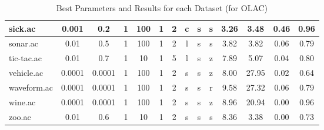\begin{table}[htbp]
\begin{tabular}{|l|c|c|c|c|c|c|c|c|c||c|c|c|c|}
		\hline
		sick.ac        & 0.001    & 0.2         & 1              & 100                 & 1             & 2             & c      & s        & s        & 3.26           & 3.48           & 0.46           & 0.96           \\
		\hline
		sonar.ac       & 0.01     & 0.5         & 1              & 100                 & 1             & 2             & l      & s        & s        & 3.82           & 3.82           & 0.06           & 0.79           \\
		\hline
		tic-tac.ac     & 0.01     & 0.7         & 1              & 10                  & 1             & 5             & l      & s        & z        & 7.89           & 5.07           & 0.04           & 0.80           \\
		\hline
		vehicle.ac     & 0.0001   & 0.0001      & 1              & 100                 & 1             & 2             & s      & s        & z        & 8.00           & 27.95          & 0.02           & 0.64           \\
		\hline
		waveform.ac    & 0.0001   & 0.0001      & 1              & 100                 & 1             & 2             & s      & s        & r        & 9.58           & 27.32          & 0.06           & 0.79           \\
		\hline
		wine.ac        & 0.0001   & 0.0001      & 1              & 100                 & 1             & 2             & s      & s        & z        & 8.96           & 20.94          & 0.00           & 0.96           \\
		\hline
		zoo.ac         & 0.01     & 0.6         & 1              & 10                  & 1             & 2             & s      & s        & s        & 8.36           & 3.38           & 0.00           & 0.73           \\
		\hline
		\end{tabular}
	\caption{Best Parameters and Results for each Dataset (for OLAC)}
	\label{tab:best_runs_for_each_db_olac}
\end{table}